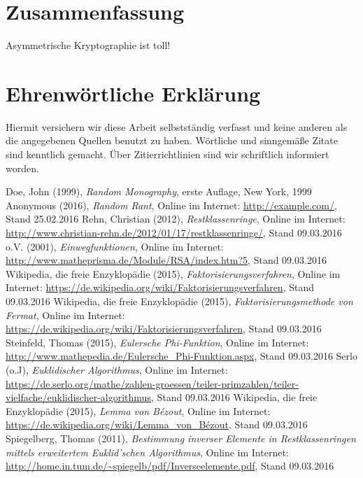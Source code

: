\documentclass[a4paper, fontsize=12pt, parskip=full, toc=bibliographynumbered]{scrreprt}
\begin{document}
\author{}
\chapter{Zusammenfassung}

Asymmetrische Kryptographie ist toll!

\author{}
\chapter{Ehrenwörtliche Erklärung}

Hiermit versichern wir diese Arbeit selbstständig verfasst und keine
anderen als die angegebenen Quellen benutzt zu haben.  Wörtliche und
sinngemäße Zitate sind kenntlich gemacht.  Über Zitierrichtlinien
sind wir schriftlich informiert worden.

\renewcommand{\bibname}{Quellenverzeichnis}
\begin{thebibliography}{9}
 Doe, John (1999), \emph{Random Monography}, erste
  Auflage, New York, 1999
 Anonymous (2016), \emph{Random Rant}, Online im
  Internet: \url{http://example.com/}, Stand 25.02.2016
 Rehn, Christian (2012), \emph{Restklassenringe}, Online im
  Internet: \url{http://www.christian-rehn.de/2012/01/17/restklassenringe/}, Stand 09.03.2016
 o.V. (2001), \emph{Einwegfunktionen}, Online im Internet: \url{http://www.matheprisma.de/Module/RSA/index.htm?5}, Stand 09.03.2016
 Wikipedia, die freie Enzyklopädie (2015), \emph{Faktorisierungsverfahren}, Online im Internet: \url{https://de.wikipedia.org/wiki/Faktorisierungsverfahren}, Stand 09.03.2016
 Wikipedia, die freie Enzyklopädie (2015), \emph{Faktorisierungsmethode von Fermat}, Online im Internet: \url{https://de.wikipedia.org/wiki/Faktorisierungsverfahren}, Stand 09.03.2016
 Steinfeld, Thomas (2015), \emph{Eulersche Phi-Funktion}, Online im Internet: \url{http://www.mathepedia.de/Eulersche_Phi-Funktion.aspx}, Stand 09.03.2016
 Serlo (o.J), \emph{Euklidischer Algorithmus}, Online im Internet: \url{https://de.serlo.org/mathe/zahlen-groessen/teiler-primzahlen/teiler-vielfache/euklidischer-algorithmus}, Stand 09.03.2016
 Wikipedia, die freie Enzyklopädie (2015), \emph{Lemma von Bézout}, Online im Internet: \url{https://de.wikipedia.org/wiki/Lemma_von_Bézout}, Stand 09.03.2016
 Spiegelberg, Thomas (2011), \emph{Bestimmung inverser Elemente in Restklassenringen mittels erweitertem Euklid'schen Algorithmus}, Online im Internet: \url{http://home.in.tum.de/~spiegelb/pdf/Inverseelemente.pdf}, Stand 09.03.2016
\end{thebibliography}
\end{document}
